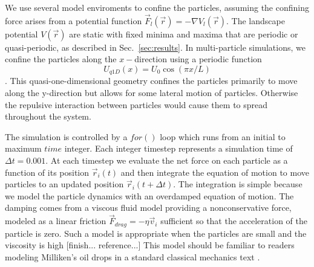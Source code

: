 \documentclass[twocolumn,preprintnumbers,amsmath,amssymb,aps,prx]{revtex4}
\begin{document}
We use several model enviroments to confine the particles,
assuming the confining force arises from a potential function 
 $\vec{F}_{l}(\vec{r}) = -\nabla V_l(\vec{r}).$
 The landscape potential $V(\vec{r}) $ are static 
 with fixed minima and maxima
 that are periodic or quasi-periodic,
 as described in Sec.~\ref{sec:results}.
% 
%
 In multi-particle simulations, we confine
 the particles along the $x-$direction 
 using a periodic function 
 \begin{equation}
   U_{q1D}(x) = U_0 \cos{(\pi x / L)}
 \end{equation}.
 This 
 quasi-one-dimensional geometry
 confines the particles
 primarily to move 
 along the y-direction
 but allows for some lateral motion of particles.
 Otherwise the repulsive interaction between
 particles would cause them to spread throughout the system.

 

The simulation is controlled by a $for()$ loop
which runs from an initial to maximum $time$ integer.
Each integer timestep
represents a simulation time of $\Delta t=0.001$.
At each timestep
we evaluate the net force on each particle as a function of its position
$\vec{r}_i(t)$
and then integrate
the equation of motion to move particles
to an updated position
$\vec{r}_i(t+\Delta t)$.
%
The integration is simple
because 
we model the 
particle dynamics 
with an overdamped
equation of motion.
The damping comes from a viscous fluid model
providing a nonconservative force,
modeled as a linear friction $\vec{F}_{drag} = -\eta \vec{v}_i$
sufficient so that
the acceleration of the particle is zero.
Such a model is appropriate when the particles
are small and the viscosity is high [finish... reference...]
This model should be familiar to readers
modeling Milliken's oil drops
in a standard classical mechanics text \cite{Taylor2005}.
\end{document}

